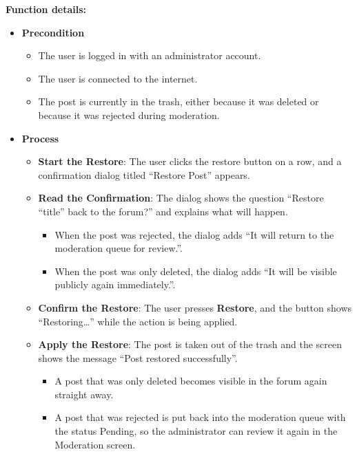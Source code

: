 \textbf{Function details:}
\begin{itemize}[leftmargin=1.6em,topsep=4pt,itemsep=3pt,parsep=0pt,label=$\bullet$]
    \item \textbf{Precondition}
        \begin{itemize}[leftmargin=2.2em,topsep=2pt,itemsep=3pt,parsep=0pt,label=$\circ$]
            \item The user is logged in with an administrator account.
            \item The user is connected to the internet.
            \item The post is currently in the trash, either because it was deleted or because it was rejected during moderation.
        \end{itemize}
    \item \textbf{Process}
        \begin{itemize}[leftmargin=2.2em,topsep=2pt,itemsep=3pt,parsep=0pt,label=$\circ$]
            \item \textbf{Start the Restore}: The user clicks the restore button on a row, and a confirmation dialog titled ``Restore Post'' appears.
            \item \textbf{Read the Confirmation}: The dialog shows the question ``Restore ``title'' back to the forum?'' and explains what will happen.
                \begin{itemize}[leftmargin=2.2em,topsep=2pt,itemsep=3pt,parsep=0pt,label=$\blacksquare$]
                    \item When the post was rejected, the dialog adds ``It will return to the moderation queue for review.''.
                    \item When the post was only deleted, the dialog adds ``It will be visible publicly again immediately.''.
                \end{itemize}
            \item \textbf{Confirm the Restore}: The user presses \textbf{Restore}, and the button shows ``Restoring\dots'' while the action is being applied.
            \item \textbf{Apply the Restore}: The post is taken out of the trash and the screen shows the message ``Post restored successfully''.
                \begin{itemize}[leftmargin=2.2em,topsep=2pt,itemsep=3pt,parsep=0pt,label=$\blacksquare$]
                    \item A post that was only deleted becomes visible in the forum again straight away.
                    \item A post that was rejected is put back into the moderation queue with the status Pending, so the administrator can review it again in the Moderation screen.

\end{itemize}
\end{itemize}
\end{itemize}
